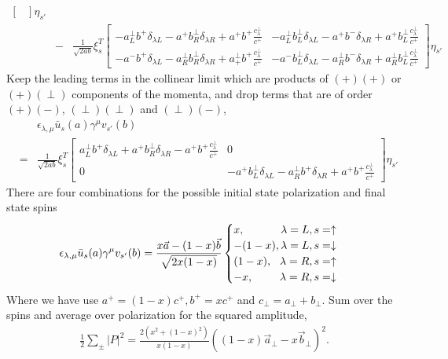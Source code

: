\begin{eqnarray}
\begin{bmatrix}
\end{bmatrix}
\eta_{s'}\\\nonumber
&-&\frac{1}{\sqrt{2ab}}
\xi_s^T
\begin{bmatrix}
-a^\perp_L b^+ \delta_{\lambda L} - a^+ b^\perp_R \delta_{\lambda R} + a^+ b^+\frac{c^\perp_\lambda}{c^+} &
-a^\perp_L b^\perp_L \delta_{\lambda L} - a^+ b^- \delta_{\lambda R} + a^+ b^\perp_L\frac{c^\perp_\lambda}{c^+}
\\
-a^- b^+ \delta_{\lambda L} - a^\perp_R b^\perp_R \delta_{\lambda R} + a^\perp_+ b^+\frac{c^\perp_\lambda}{c^+} &
-a^- b^\perp_L \delta_{\lambda L} - a^\perp_R b^- \delta_{\lambda R} + a^\perp_R b^\perp_L\frac{c^\perp_\lambda}{c^+}
\end{bmatrix}
\eta_{s'}
\end{eqnarray}
Keep the leading terms in the collinear limit which are products of $(+)(+)$ or $(+)(\perp)$ components of the momenta, and drop terms that are of order $(+)(-)$, $(\perp)(\perp)$ and $(\perp)(-)$,
\begin{eqnarray}
&&\epsilon_{\lambda, \mu} \bar{u}_s(a)\gamma^\mu v_{s'}(b)\\
&=& \frac{1}{\sqrt{2ab}}
\xi_s^T
\begin{bmatrix}
a^\perp_L b^+ \delta_{\lambda L} + a^+ b^\perp_R \delta_{\lambda R} - a^+ b^+\frac{c^\perp_\lambda}{c^+} & 0\\
0 & -a^+ b^\perp_L \delta_{\lambda L} - a^\perp_R b^+ \delta_{\lambda R} + a^+ b^+\frac{c^\perp_\lambda}{c^+}
\end{bmatrix}
\eta_{s'}
\end{eqnarray}
There are four combinations for the possible initial state polarization and final state spins
\begin{eqnarray}
\epsilon_{\lambda, \mu} \bar{u}_s(a)\gamma^\mu v_{s'}(b) = \frac{x\vec{a} - (1-x)\vec{b}}{\sqrt{2x(1-x)}}
\begin{cases}
x, \hfill \lambda=L, s=\uparrow\\
-(1-x), \hfill \lambda=L, s=\downarrow\\
(1-x), \hfill \lambda=R, s=\uparrow\\
-x, \hfill \lambda=R, s=\downarrow\\
\end{cases}
\end{eqnarray}
Where we have use $a^+ = (1-x)c^+, b^+ = xc^+$ and $c_\perp = a_\perp+b_\perp$.
Sum over the spins and average over polarization for the squared amplitude,
\begin{eqnarray}
\frac{1}{2}\sum_\pm |P|^2 = \frac{2(x^2 + (1-x)^2)}{x(1-x)} \left((1-x)\vec{a}_\perp-x\vec{b}_\perp\right)^2.
\end{eqnarray}

